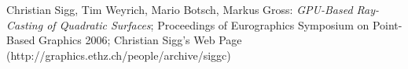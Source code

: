 \begin{thebibliography}{10}
 Christian Sigg, Tim Weyrich, Mario Botsch, Markus Gross: {\em GPU-Based Ray-Casting of Quadratic Surfaces}; Proceedings of Eurographics Symposium on Point-Based Graphics 2006;
 Christian Sigg's Web Page (http://graphics.ethz.ch/people/archive/siggc)
\end{thebibliography}
